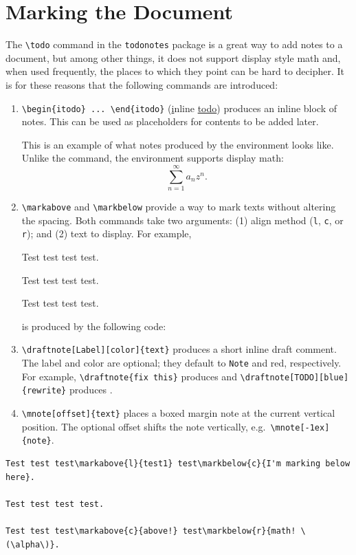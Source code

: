\documentclass[12pt]{article}
\newcommand{\cmd}[1]{\texttt{\small\detokenize{#1}}}
\begin{document}
\section{Marking the Document}
\label{sec:marking}
The \verb|\todo| command in the \verb|todonotes| package is a great way to add notes to a document, but among other things, it does not support display style math and, when used frequently, the places to which they point can be hard to decipher. 
It is for these reasons that the following commands are introduced:
\begin{enumerate}[label=(\alph*)]
  \item \verb|\begin{itodo} ... \end{itodo}| (\underline{i}nline \underline{todo}) produces an inline block of notes. 
    This can be used as placeholders for contents to be added later. 
    \begin{itodo}
      This is an example of what notes produced by the \cmd{itodo} environment looks like. 
        Unlike the \cmd{\todo} command, the \cmd{itodo} environment supports display math:
      \[
        \sum_{n=1}^{\infty} a_n z^n . 
      \] 
    \end{itodo}
  \item \verb|\markabove| and \verb|\markbelow| provide a way to mark texts without altering the spacing. 
  Both commands take two arguments: (1) align method (\verb|l|, \verb|c|, or \verb|r|); and (2) text to display. 
  For example, 

  \begin{tcolorbox}[sharp corners, boxrule=1pt, left=0pt, right=0pt, top=0pt, bottom=0pt]
    \noindent
    Test test test test.

    \noindent
    Test test test test.

    \noindent
    Test test test test.
  \end{tcolorbox}
  is produced by the following code:
  \item \verb|\draftnote[Label][color]{text}| produces a short inline draft comment.
  The label and color are optional; they default to \verb|Note| and red, respectively.
  For example, \verb|\draftnote{fix this}| produces  and \verb|\draftnote[TODO][blue]{rewrite}| produces .
  \item \verb|\mnote[offset]{text}| places a boxed margin note at the current vertical position.
  The optional offset shifts the note vertically, e.g.\ \verb|\mnote[-1ex]{note}|.
\end{enumerate}
\begin{verbatim}
Test test test\markabove{l}{test1} test\markbelow{c}{I'm marking below here}.

Test test test test.

Test test test\markabove{c}{above!} test\markbelow{r}{math! \(\alpha\)}.
\end{verbatim}
\end{document}
